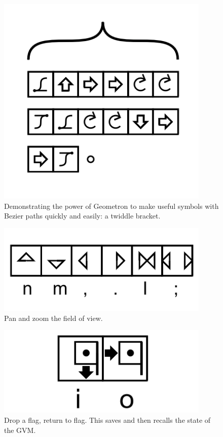\begin{figure}
	\centering
	\includegraphics[width=4in]{figures/web2d/bezierbracket.png}
	\caption[bezierbracket]
	{Demonstrating the power of Geometron to make useful symbols with Bezier paths quickly and easily: a twiddle bracket.}
\end{figure}


\begin{figure}
	\centering
	\includegraphics[width=4in]{figures/web2d/panzoom.png}
	\caption[panzoom]
	{Pan and zoom the field of view.}
\end{figure}

\begin{figure}
	\centering
	\includegraphics[width=4in]{figures/web2d/flagactions.png}
	\caption[flagactions]
	{Drop a flag, return to flag.  This saves and then recalls the state of the GVM.}
\end{figure}


